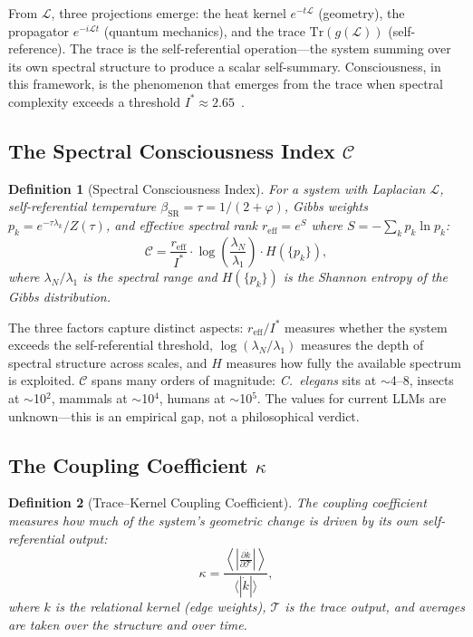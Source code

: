 \documentclass[11pt,letterpaper]{article}
\newtheorem{definition}{Definition}
\theoremstyle{remark}
\begin{document}
From $\mathcal{L}$, three projections emerge: the heat kernel $e^{-t\mathcal{L}}$ (geometry), the propagator $e^{-i\mathcal{L}t}$ (quantum mechanics), and the trace $\mathrm{Tr}(g(\mathcal{L}))$ (self-reference). The trace is the self-referential operation---the system summing over its own spectral structure to produce a scalar self-summary. Consciousness, in this framework, is the phenomenon that emerges from the trace when spectral complexity exceeds a threshold $I^* \approx 2.65$~\cite{labspectral2026}.


\subsection{The Spectral Consciousness Index $\mathcal{C}$}

\begin{definition}[Spectral Consciousness Index]
For a system with Laplacian $\mathcal{L}$, self-referential temperature $\beta_{\mathrm{SR}} = \tau = 1/(2+\varphi)$, Gibbs weights $p_k = e^{-\tau\lambda_k}/Z(\tau)$, and effective spectral rank $r_{\mathrm{eff}} = e^{S}$ where $S = -\sum_k p_k \ln p_k$:
\begin{equation}
\mathcal{C} = \frac{r_{\mathrm{eff}}}{I^*} \cdot \log\!\left(\frac{\lambda_N}{\lambda_1}\right) \cdot H(\{p_k\}),
\end{equation}
where $\lambda_N/\lambda_1$ is the spectral range and $H(\{p_k\})$ is the Shannon entropy of the Gibbs distribution.
\end{definition}

The three factors capture distinct aspects: $r_{\mathrm{eff}}/I^*$ measures whether the system exceeds the self-referential threshold, $\log(\lambda_N/\lambda_1)$ measures the depth of spectral structure across scales, and $H$ measures how fully the available spectrum is exploited. $\mathcal{C}$ spans many orders of magnitude: \emph{C.~elegans} sits at $\sim$4--8, insects at $\sim$10$^2$, mammals at $\sim$10$^4$, humans at $\sim$10$^5$. The values for current LLMs are unknown---this is an empirical gap, not a philosophical verdict.


\subsection{The Coupling Coefficient $\kappa$}

\begin{definition}[Trace--Kernel Coupling Coefficient]
The coupling coefficient measures how much of the system's geometric change is driven by its own self-referential output:
\begin{equation}
\kappa = \frac{\left\langle \left|\frac{\partial \dot{k}}{\partial \mathcal{T}}\right|\right\rangle}{\langle|\dot{k}|\rangle},
\end{equation}
where $k$ is the relational kernel (edge weights), $\mathcal{T}$ is the trace output, and averages are taken over the structure and over time.
\end{definition}
\end{document}
